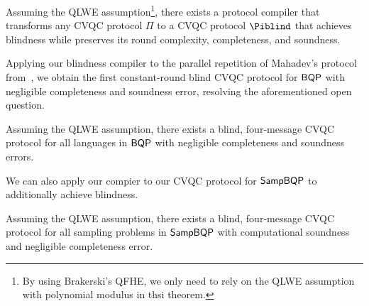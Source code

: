 %
%
\begin{theorem}[informal]
Assuming the QLWE assumption\footnote{By using Brakerski's QFHE, we only need to rely on the QLWE assumption with polynomial modulus in thsi theorem.}, there exists a protocol compiler that transforms any CVQC protocol $\Pi$ to a CVQC protocol $\Piblind$ that achieves blindness while preserves its round complexity, completeness, and soundness.
\end{theorem}

Applying our blindness compiler to the parallel repetition of Mahadev's protocol from~\cite{arXiv:ChiaChungYam19, arXiv:AlaChiHun19}, we obtain the first constant-round blind CVQC protocol for $\operatorname{\mathsf{BQP}}$ with negligible completeness and soundness error, resolving the aforementioned open question.

\begin{theorem}[informal]
    Assuming the QLWE assumption, there exists a blind, four-message CVQC protocol for all languages in $\operatorname{\mathsf{BQP}}$ with negligible completeness and soundness errors.
\end{theorem}

We can also apply our compier to our CVQC protocol for $\operatorname{\mathsf{SampBQP}}$ to additionally achieve blindness. 

\begin{theorem}[informal]
        Assuming the QLWE assumption, there exists a blind, four-message CVQC protocol for all sampling problems in $\operatorname{\mathsf{SampBQP}}$ with  computational soundness and negligible completeness error.
\end{theorem}


